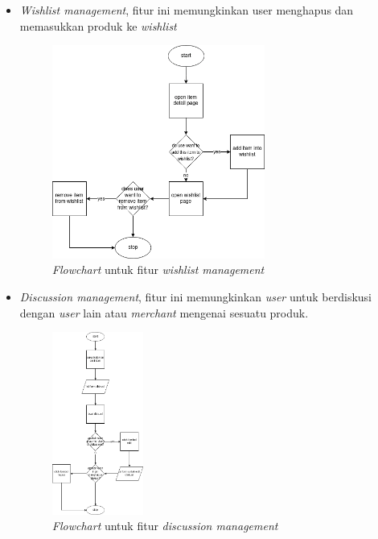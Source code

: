 \documentclass[a4paper]{article}
\begin{document}
\begin{enumerate}[label=\alph*. ]
\begin{itemize}
            \newpage
            \item \textit{Wishlist management}, fitur ini memungkinkan user menghapus dan memasukkan produk ke \textit{wishlist}
            \begin{figure}[h]
                \centering
                \includegraphics*[height=7cm]{./diagram/flowchart/chart/Wishlist management.png}
                \caption{\textit{Flowchart} untuk fitur \textit{wishlist management}}
            \end{figure}

            \item \textit{Discussion management}, fitur ini memungkinkan \textit{user} untuk berdiskusi dengan \textit{user} lain atau \textit{merchant} mengenai sesuatu produk.
            \begin{figure}[h]
                \centering
                \includegraphics*[height=6cm]{./diagram/flowchart/chart/manage discussion.png}
                \caption{\textit{Flowchart} untuk fitur \textit{discussion management}}
            \end{figure}
            \newpage


\end{itemize}
\end{enumerate}
\end{document}
